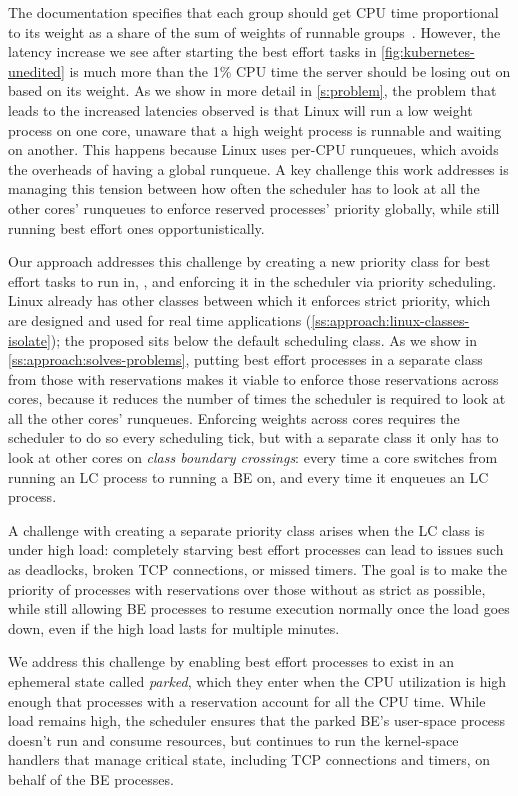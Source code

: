 The \cgroups{} documentation specifies that each group should get CPU time
proportional to its weight as a share of the sum of weights of runnable
groups~\cite{cgroups-kerneldocs}. However, the latency increase we see after
starting the best effort tasks in \autoref{fig:kubernetes-unedited} is much more
than the 1\% CPU time the server should be losing out on based on its weight. As
we show in more detail in \autoref{s:problem}, the problem that leads to the
increased latencies observed is that Linux will run a low weight process on one
core, unaware that a high weight process is runnable and waiting on another.
This happens because Linux uses per-CPU runqueues, which avoids the overheads of
having a global runqueue. A key challenge this work addresses is managing this
tension between how often the scheduler has to look at all the other cores'
runqueues to enforce reserved processes' priority globally, while still running
best effort ones opportunistically.

Our approach addresses this challenge by creating a new priority class for best
effort tasks to run in, \beclass{}, and enforcing it in the scheduler via
priority scheduling. Linux already has other classes between which it enforces
strict priority, which are designed and used for real time applications
(\autoref{ss:approach:linux-classes-isolate}); the proposed \beclass{} sits
below the default scheduling class. As we show in
\autoref{ss:approach:solves-problems}, putting best effort processes in a
separate class from those with reservations makes it viable to enforce those
reservations across cores, because it reduces the number of times the scheduler
is required to look at all the other cores' runqueues. Enforcing weights across
cores requires the scheduler to do so every scheduling tick, but with a separate
class it only has to look at other cores on \textit{class boundary crossings}:
every time a core switches from running an LC process to running a BE on, and
every time it enqueues an LC process.

A challenge with creating a separate priority class arises when the LC class is
under high load: completely starving best effort processes can lead to issues
such as deadlocks, broken TCP connections, or missed timers. The goal is to make
the priority of processes with reservations over those without as strict as
possible, while still allowing BE processes to resume execution normally once
the load goes down, even if the high load lasts for multiple minutes.

We address this challenge by enabling best effort processes to exist in an
ephemeral state called \textit{parked}, which they enter when the CPU
utilization is high enough that processes with a reservation account for all the
CPU time. While load remains high, the scheduler ensures that the parked BE's
user-space process doesn't run and consume resources, but continues to run the
kernel-space handlers that manage critical state, including TCP connections and
timers, on behalf of the BE processes. 

